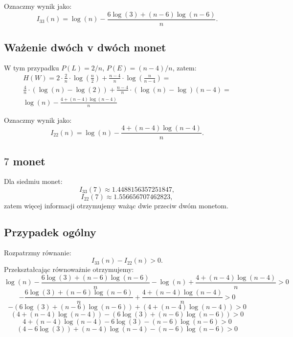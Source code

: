Oznaczmy wynik jako:
$$
	I_{33}(n) = \log(n) - \frac{6\log(3) + (n-6)\log(n-6)}{n}.
$$

\subsection*{Ważenie dwóch v dwóch monet}

W tym przypadku $P(L) = 2/n$, $P(E) = (n-4)/n$, zatem:
\begin{align}
	H(W) = 2 \cdot \frac{2}{n} \cdot \log(\frac{n}{2}) + \frac{n-4}{n} \cdot \log(\frac{n}{n-4}) =\\
	\frac{4}{n} \cdot (\log(n) - \log(2)) + \frac{n-4}{n}\cdot(\log(n) - \log)(n-4) = \\
	\log(n) - \frac{4 + (n-4)\log(n-4)}{n}
\end{align}

Oznaczmy wynik jako:
$$
	I_{22}(n) = \log(n) - \frac{4 + (n-4)\log(n-4)}{n}.
$$

\subsection*{$7$ monet}
Dla siedmiu monet:
$$
	I_{33}(7) \approx 1.4488156357251847,
$$
$$
	I_{22}(7) \approx 1.556656707462823,
$$
zatem więcej informacji otrzymujemy ważąc dwie przeciw dwóm monetom.

\subsection*{Przypadek ogólny}
Rozpatrzmy równanie:
$$
	I_{33}(n) - I_{22}(n) > 0.
$$
Przekształcając równoważnie otrzymujemy:
$$
\log(n) - \frac{6\log(3) + (n-6)\log(n-6)}{n} - \log(n) + \frac{4 + (n-4)\log(n-4)}{n} > 0
$$
$$
 - \frac{6\log(3) + (n-6)\log(n-6)}{n} + \frac{4 + (n-4)\log(n-4)}{n} > 0
$$
$$
 -(6\log(3) + (n-6)\log(n-6)) + (4 + (n-4)\log(n-4)) > 0
$$
$$
(4 + (n-4)\log(n-4))-(6\log(3) + (n-6)\log(n-6)) > 0
$$
$$
4 + (n-4)\log(n-4) - 6\log(3) - (n-6)\log(n-6) > 0
$$
$$
(4 - 6\log(3)) + (n-4)\log(n-4) - (n-6)\log(n-6) > 0
$$


